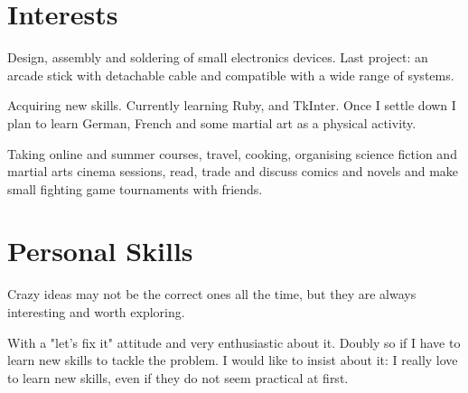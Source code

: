 \documentclass[11pt,a4paper,roman]{moderncv}
\begin{document}



\section{Interests}

	{Design, assembly and soldering of small electronics devices. Last project: an arcade stick with detachable cable and compatible with a wide range of systems.}

	{Acquiring new skills. Currently learning Ruby, and TkInter.
	Once I settle down I plan to learn German, French and some martial art as a 
	physical activity.}


	{Taking online and summer courses, travel, cooking, organising science fiction and martial arts cinema sessions, read, trade and discuss comics and novels and make small fighting game tournaments with friends.}



\section{Personal Skills}

{Crazy ideas may not be the correct ones all the time, but they are always interesting and worth exploring.}

{With a "let's fix it" attitude and very enthusiastic about it. Doubly so if I have to learn new skills to tackle the problem. I would like to insist about it: I really love to learn new skills, even if they do not seem practical at first.}
\end{document}
